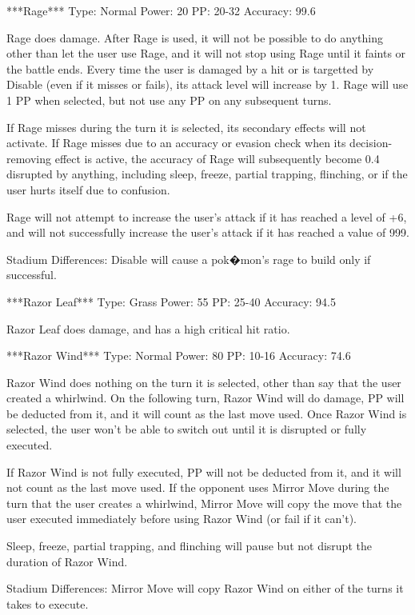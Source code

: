 \documentclass[reprint, aps, prl, paper=A4]{revtex4-1}
\begin{document}
***Rage***
Type: Normal
Power: 20
PP: 20-32
Accuracy: 99.6%

Rage does damage. After Rage is used, it will not be possible to do anything other than let the
user use Rage, and it will not stop using Rage until it faints or the battle ends. Every time
the user is damaged by a hit or is targetted by Disable (even if it misses or fails), its
attack level will increase by 1. Rage will use 1 PP when selected, but not use any PP on any
subsequent turns.

If Rage misses during the turn it is selected, its secondary effects will not activate. If Rage
misses due to an accuracy or evasion check when its decision-removing effect is active, the
accuracy of Rage will subsequently become 0.4%
disrupted by anything, including sleep, freeze, partial trapping, flinching, or if the user
hurts itself due to confusion.

Rage will not attempt to increase the user's attack if it has reached a level of +6, and will
not successfully increase the user's attack if it has reached a value of 999.

Stadium Differences:
Disable will cause a pok�mon's rage to build only if successful.


***Razor Leaf***
Type: Grass
Power: 55
PP: 25-40
Accuracy: 94.5%

Razor Leaf does damage, and has a high critical hit ratio.


***Razor Wind***
Type: Normal
Power: 80
PP: 10-16
Accuracy: 74.6%

Razor Wind does nothing on the turn it is selected, other than say that the user created a
whirlwind. On the following turn, Razor Wind will do damage, PP will be deducted from it, and
it will count as the last move used. Once Razor Wind is selected, the user won't be able to
switch out until it is disrupted or fully executed.

If Razor Wind is not fully executed, PP will not be deducted from it, and it will not count as
the last move used. If the opponent uses Mirror Move during the turn that the user creates a
whirlwind, Mirror Move will copy the move that the user executed immediately before using Razor
Wind (or fail if it can't).

Sleep, freeze, partial trapping, and flinching will pause but not disrupt the duration of Razor
Wind.

Stadium Differences:
Mirror Move will copy Razor Wind on either of the turns it takes to execute.
\end{document}
